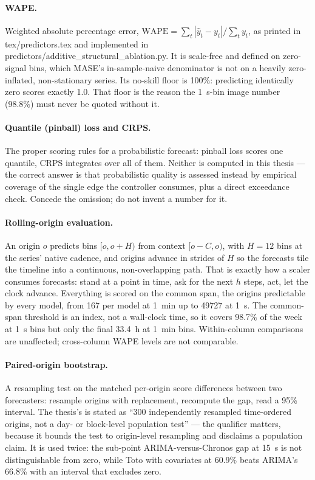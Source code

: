 \documentclass[11pt,a4paper]{article}
\def\emph#1{#1}\def\texttt#1{#1}%
\begin{document}
\paragraph{WAPE.} Weighted absolute percentage error,
$\text{WAPE} = \sum_t |\hat y_t - y_t| \big/ \sum_t y_t$, as printed in
\texttt{tex/predictors.tex} and implemented in
\texttt{predictors/additive\_structural\_ablation.py}. It is scale-free and
defined on zero-signal bins, which MASE's in-sample-naive denominator is not
on a heavily zero-inflated, non-stationary series. Its no-skill floor is
100\%: predicting identically zero scores exactly 1.0. That floor is the
reason the \SI{1}{\second}-bin image number (98.8\%) must never be quoted
without it.

\paragraph{Quantile (pinball) loss and CRPS.} The proper scoring rules for a
probabilistic forecast: pinball loss scores one quantile, CRPS integrates
over all of them. \emph{Neither is computed in this thesis} --- the correct
answer is that probabilistic quality is assessed instead by empirical
coverage of the single edge the controller consumes, plus a direct exceedance
check. Concede the omission; do not invent a number for it.

\paragraph{Rolling-origin evaluation.} An origin $o$ predicts bins
$[o, o{+}H)$ from context $[o{-}C, o)$, with $H{=}12$ bins at the series'
native cadence, and origins advance in strides of $H$ so the forecasts tile
the timeline into a continuous, non-overlapping path. That is exactly how a
scaler consumes forecasts: stand at a point in time, ask for the next $h$
steps, act, let the clock advance. Everything is scored on the \emph{common
span}, the origins predictable by every model, from 167 per model at
\SI{1}{\minute} up to \num{49727} at \SI{1}{\second}. The common-span
threshold is an \emph{index}, not a wall-clock time, so it covers 98.7\% of
the week at \SI{1}{\second} bins but only the final \SI{33.4}{\hour} at
\SI{1}{\minute} bins. Within-column comparisons are unaffected; cross-column
WAPE levels are not comparable.

\paragraph{Paired-origin bootstrap.} A resampling test on the \emph{matched
per-origin} score differences between two forecasters: resample origins with
replacement, recompute the gap, read a 95\% interval. The thesis's is stated
as ``300 independently resampled time-ordered origins, not a day- or
block-level population test'' --- the qualifier matters, because it bounds
the test to origin-level resampling and disclaims a population claim. It is
used twice: the sub-point ARIMA-versus-Chronos gap at \SI{15}{\second} is
\emph{not} distinguishable from zero, while Toto with covariates at 60.9\%
beats ARIMA's 66.8\% with an interval that excludes zero.
\end{document}
